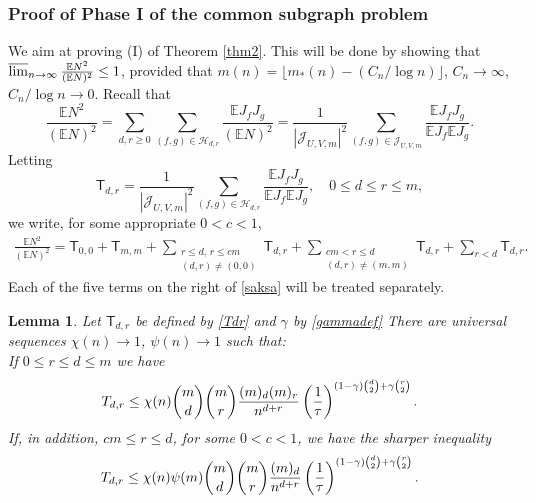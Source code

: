 \documentclass[reqno]{amsart}
\theoremstyle{theorem}
\newtheorem{lemma}[theorem]{Lemma}
\theoremstyle{definition}
\theoremstyle{remark}
\def\E{\mathbb{E}}
\def\HH{\mathscr{H}}
\newcommand{\1}{{\text{\Large $\mathfrak 1$}}}	%
\renewcommand{\limsup}{\varlimsup}
\numberwithin{equation}{section}
\def\JJ{\mathscr J}
\def\TTT{\mathsf T}
\begin{document}
\subsubsection{\bfseries Proof of Phase I of the common subgraph problem}
We aim at proving (I) of Theorem \ref{thm2}. This will be done by showing that
$\limsup_{n \to \infty} \frac{\E N^2}{(\E N)^2}\le 1$, provided that
$m(n)= \lfloor m_*(n)-(C_n/\log n)\rfloor$, $C_n \to \infty$,
$C_n/\log n \to 0$.
Recall that
\begin{equation}
\label{recallratio}
\frac{\E N^2}{(\E N)^2} 
= \sum_{d, r \ge 0} \sum_{(f, g) \in \HH_{d, r}} \frac{\E J_f J_g}{(\E N)^2}
= \frac{1}{|\JJ_{U,V,m}|^2} \sum_{(f, g) \in \JJ_{U,V,m}} \frac{\E J_f J_g}{\E J_f \E J_g}.
\end{equation}
Letting
\begin{equation}
\label{Tdr}
\TTT_{d, r} 
= \frac{1}{|\JJ_{U,V,m}|^2} 
\sum_{(f, g) \in \HH_{d, r}} \frac{\E J_f J_g}{\E J_f \E J_g}, \quad
0 \le d \le r \le m,
\end{equation}
we write, for some appropriate $0<c<1$,
\begin{gather}
\frac{\E N^2}{(\E N)^2} %
= \TTT_{0,0} + \TTT_{m,m} + \sum_{\substack{r\le d,\,r\le cm \\ (d,r)\neq (0,0) }} \TTT_{d,r}
+ \sum_{\substack{cm < r \le d \\ (d,r) \neq (m,m) }} \TTT_{d,r}
+ \sum_{r < d} \TTT_{d,r}.
\label{saksa}
\end{gather}  
Each of the five terms on the right of \eqref{saksa} will be treated separately.


\begin{lemma} \label{termuplem}
Let $\TTT_{d,r}$ be defined by \eqref{Tdr} and $\gamma$ by \eqref{gammadef}
There are universal sequences $\chi(n) \to 1$, $\psi(n)\to 1$ such that:
\\
If $0\le r \le d\le m$ we have
\begin{equation}
\label{termupeq1}
\mathcal \TTT_{d, r} \le \chi (n) \binom{m}{d} \binom{m}{r} \frac{(m)_d (m)_r}{n^{d+r}}
\left( \frac{1}{\tau} \right)^{(1-\gamma) \binom{d}{2} + \gamma \binom{r}{2}}.
\end{equation}
If, in addition, $cm \le r \le d$, for some $0<c<1$, we have the sharper inequality
\begin{equation}
\label{termupeq2}
\mathcal \TTT_{d, r} \le \chi(n) \psi (m) \binom{m}{d} \binom{m}{r} \frac{(m)_d}{n^{d+r}}
\left( \frac{1}{\tau} \right)^{(1-\gamma) \binom{d}{2} + \gamma \binom{r}{2}}.
\end{equation}
\end{lemma}
\end{document}
